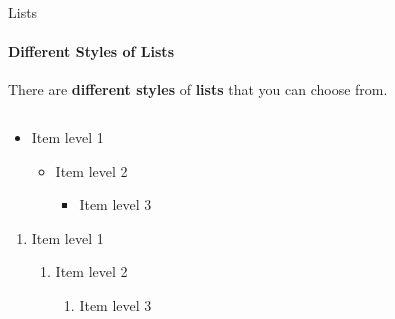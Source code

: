 \documentclass[aspectratio=169]{beamer}
\begin{document}
\begin{frame}{Lists}
    \framesubtitle{Different Styles of Lists}

    \begin{coloredblock}[yellow]
        \centering
        There are \textbf{different styles} of \textbf{lists} that you can choose from.
    \end{coloredblock}

    \vspace{-0.5cm}

    \begin{columns}
        \begin{column}{0.49\textwidth}
            \begin{coloredblock}
                \begin{itemize}
                    \item Item level 1
                    \begin{itemize}
                        \item Item level 2
                        \begin{itemize}
                            \item Item level 3
                        \end{itemize}
                    \end{itemize}
                \end{itemize}
            \end{coloredblock}
    
            \begin{coloredblock}
                \begin{enumerate}
                \item Item level 1
                    \begin{enumerate}
                        \item Item level 2
                        \begin{enumerate}
                            \item Item level 3
                        \end{enumerate}
                    \end{enumerate}
                \end{enumerate}
            \end{coloredblock}
        \end{column}
        

\end{columns}
\end{frame}
\end{document}
